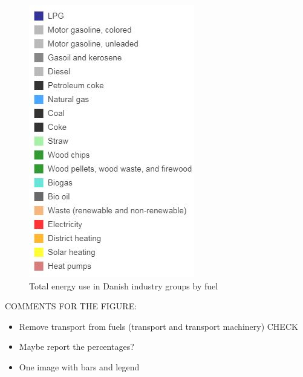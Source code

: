 \documentclass[review]{elsarticle}
\begin{document}
\begin{figure}
\begin{minipage}{.3\textwidth}
  \includegraphics[width=\linewidth]{Img/dan_ind/legend}
\end{minipage}
  \caption{Total energy use in Danish industry groups by fuel \cite{VM2015}}
  \label{total_use} 
\end{figure}


COMMENTS FOR THE FIGURE:
\begin{itemize}
    \item Remove transport from fuels (transport and transport machinery) CHECK
    \item Maybe report the percentages?
    \item One image with bars and legend
\end{itemize}
\end{document}
